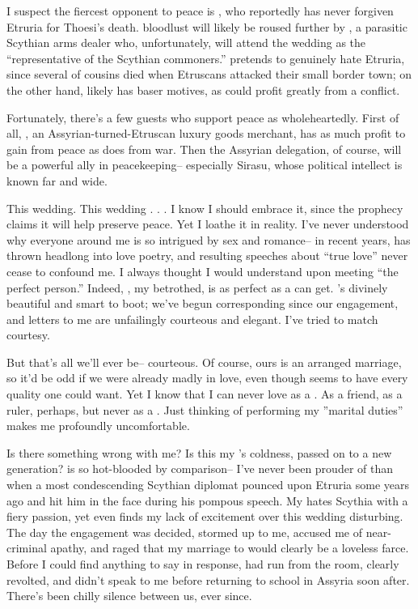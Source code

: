 \documentclass[char]{Kos}
\begin{document}
I suspect the fiercest opponent to peace is \cScythiaQueen{\Monarch} \cScythiaQueen{}, who reportedly has never forgiven Etruria for Thoesi's death. \cScythiaQueen{\Their} bloodlust will likely be roused further by \cArmsDealer{}, a parasitic Scythian arms dealer who, unfortunately, will attend the wedding as the ``representative of the Scythian commoners.'' \cArmsDealer{\They} pretends to genuinely hate Etruria, since several of \cArmsDealer{\their} cousins died when Etruscans attacked their small border town; on the other hand, \cArmsDealer{\they} likely has baser motives, as \cArmsDealer{\they} could profit greatly from a conflict. 

Fortunately, there's a few guests who support peace as wholeheartedly. First of all, \cMerchant{}, an Assyrian-turned-Etruscan luxury goods merchant, has as much profit to gain from peace as \cArmsDealer{} does from war. Then the Assyrian delegation, of course, will be a powerful ally in peacekeeping-- especially Sirasu, whose political intellect is known far and wide.

This wedding. This wedding . . . I know I should embrace it, since the prophecy claims it will help preserve peace. Yet I loathe it in reality. I've never understood why everyone around me is so intrigued by sex and romance-- in recent years, \cPoet{} has thrown \cPoet{\themself} headlong into love poetry, and \cPoet{\their} resulting speeches about ``true love'' never cease to confound me. I always thought I would understand upon meeting ``the perfect person.'' Indeed, \cBride{}, my betrothed, is as perfect as a \cBride{\human} can get. \cBride{\They}'s divinely beautiful and smart to boot; we've begun corresponding since our engagement, and \cBride{\their} letters to me are unfailingly courteous and elegant. I've tried to match \cBride{\their} courtesy. 

But that's all we'll ever be-- courteous. Of course, ours is an arranged marriage, so it'd be odd if we were already madly in love, even though \cBride{\they} seems to have every quality one could want. Yet I know that I can never love \cBride{\them} as a \cBride{\spouse}. As a friend, as a ruler, perhaps, but never as a \cBride{\spouse}. Just thinking of performing my ''marital duties'' makes me profoundly uncomfortable.

Is there something wrong with me? Is this my \cEtruriaKing{\parent}'s coldness, passed on to a new generation? \cPoet{} is so hot-blooded by comparison-- I've never been prouder of \cPoet{\them} than when a most condescending Scythian diplomat pounced upon Etruria some years ago and \cPoet{\they} hit him in the face during his pompous speech. My \cPoet{\sibling} hates Scythia with a fiery passion, yet even \cPoet{\they} finds my lack of excitement over this wedding disturbing. The day the engagement was decided, \cPoet{\they} stormed up to me, accused me of near-criminal apathy, and raged that my marriage to \cBride{} would clearly be a loveless farce. Before I could find anything to say in response, \cPoet{} had run from the room, clearly revolted, and \cPoet{\they} didn't speak to me before returning to school in Assyria soon after. There's been chilly silence between us, ever since.
\end{document}
